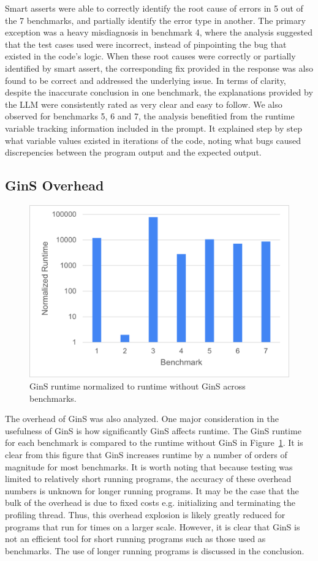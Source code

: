 \documentclass[sigconf,nonacm]{acmart}
\begin{document}
Smart asserts were able to correctly identify the root cause of errors in 5 out of the 7 benchmarks, and partially identify the error type in another. The primary exception was a heavy misdiagnosis in benchmark 4, where the analysis suggested that the test cases used were incorrect, instead of pinpointing the bug that existed in the code's logic.
When these root causes were correctly or partially identified by smart assert, the corresponding fix provided in the response was also found to be correct and addressed the underlying issue.
In terms of clarity, despite the inaccurate conclusion in one benchmark, the explanations provided by the LLM were consistently rated as very clear and easy to follow.
We also observed for benchmarks 5, 6 and 7, the analysis benefitied from the runtime variable tracking information included in the prompt. It explained step by step what variable values existed in iterations of the code, noting what bugs caused discrepencies between the program output and the expected output.

\subsection{GinS Overhead}
\begin{figure}
    \centering
    \includegraphics[width=0.8\linewidth]{images/Time.png}
    \caption{GinS runtime normalized to runtime without GinS across benchmarks.}
    \label{fig:time}
\end{figure}
The overhead of GinS was also analyzed.
One major consideration in the usefulness of GinS is how significantly GinS affects runtime.
The GinS runtime for each benchmark is compared to the runtime without GinS in Figure~\ref{fig:time}.
It is clear from this figure that GinS increases runtime by a number of orders of magnitude for most benchmarks.
It is worth noting that because testing was limited to relatively short running programs, the accuracy of these overhead numbers is unknown for longer running programs.
It may be the case that the bulk of the overhead is due to fixed costs e.g. initializing and terminating the profiling thread.
Thus, this overhead explosion is likely greatly reduced for programs that run for times on a larger scale.
However, it is clear that GinS is not an efficient tool for short running programs such as those used as benchmarks.
The use of longer running programs is discussed in the conclusion.
\end{document}
